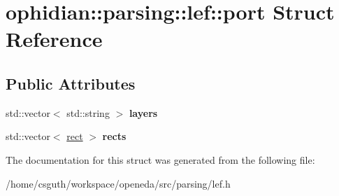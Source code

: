 \hypertarget{structophidian_1_1parsing_1_1lef_1_1port}{\section{ophidian\-:\-:parsing\-:\-:lef\-:\-:port Struct Reference}
\label{structophidian_1_1parsing_1_1lef_1_1port}
}
\subsection*{Public Attributes}
\begin{DoxyCompactItemize}
\item 
\hypertarget{structophidian_1_1parsing_1_1lef_1_1port_abf15f7e741e20a7dc97a11c1ac4aec2e}{std\-::vector$<$ std\-::string $>$ {\bfseries layers}}\label{structophidian_1_1parsing_1_1lef_1_1port_abf15f7e741e20a7dc97a11c1ac4aec2e}

\item 
\hypertarget{structophidian_1_1parsing_1_1lef_1_1port_a3be22f2c87cf9deaacb9cbba69141ef7}{std\-::vector$<$ \hyperlink{structophidian_1_1parsing_1_1lef_1_1rect}{rect} $>$ {\bfseries rects}}\label{structophidian_1_1parsing_1_1lef_1_1port_a3be22f2c87cf9deaacb9cbba69141ef7}

\end{DoxyCompactItemize}


The documentation for this struct was generated from the following file\-:\begin{DoxyCompactItemize}
\item 
/home/csguth/workspace/openeda/src/parsing/lef.\-h\end{DoxyCompactItemize}
